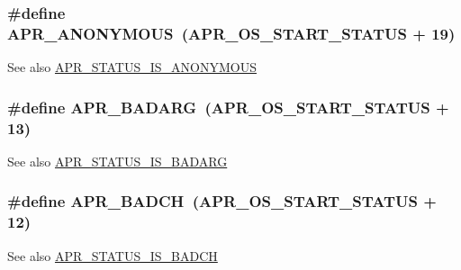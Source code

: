 \subsubsection[{\texorpdfstring{A\+P\+R\+\_\+\+A\+N\+O\+N\+Y\+M\+O\+US}{APR_ANONYMOUS}}]{\setlength{\rightskip}{0pt plus 5cm}\#define A\+P\+R\+\_\+\+A\+N\+O\+N\+Y\+M\+O\+US~({\bf A\+P\+R\+\_\+\+O\+S\+\_\+\+S\+T\+A\+R\+T\+\_\+\+S\+T\+A\+T\+US} + 19)}\hypertarget{group___a_p_r___error_ga738a229b0c27bd96ae0173fecab251b7}{}\label{group___a_p_r___error_ga738a229b0c27bd96ae0173fecab251b7}
\begin{DoxySeeAlso}{See also}
\hyperlink{group___a_p_r___s_t_a_t_u_s___i_s_gaf0184ec185c17a43b2cc47d475f02cbd}{A\+P\+R\+\_\+\+S\+T\+A\+T\+U\+S\+\_\+\+I\+S\+\_\+\+A\+N\+O\+N\+Y\+M\+O\+US} 
\end{DoxySeeAlso}
\subsubsection[{\texorpdfstring{A\+P\+R\+\_\+\+B\+A\+D\+A\+RG}{APR_BADARG}}]{\setlength{\rightskip}{0pt plus 5cm}\#define A\+P\+R\+\_\+\+B\+A\+D\+A\+RG~({\bf A\+P\+R\+\_\+\+O\+S\+\_\+\+S\+T\+A\+R\+T\+\_\+\+S\+T\+A\+T\+US} + 13)}\hypertarget{group___a_p_r___error_ga771bf48ab38d93355be8530f6efe4ae9}{}\label{group___a_p_r___error_ga771bf48ab38d93355be8530f6efe4ae9}
\begin{DoxySeeAlso}{See also}
\hyperlink{group___a_p_r___s_t_a_t_u_s___i_s_gaf784c37a602fdc328436ecda79110f43}{A\+P\+R\+\_\+\+S\+T\+A\+T\+U\+S\+\_\+\+I\+S\+\_\+\+B\+A\+D\+A\+RG} 
\end{DoxySeeAlso}
\subsubsection[{\texorpdfstring{A\+P\+R\+\_\+\+B\+A\+D\+CH}{APR_BADCH}}]{\setlength{\rightskip}{0pt plus 5cm}\#define A\+P\+R\+\_\+\+B\+A\+D\+CH~({\bf A\+P\+R\+\_\+\+O\+S\+\_\+\+S\+T\+A\+R\+T\+\_\+\+S\+T\+A\+T\+US} + 12)}\hypertarget{group___a_p_r___error_ga6f3ca71069880d9fe5678687a257d616}{}\label{group___a_p_r___error_ga6f3ca71069880d9fe5678687a257d616}
\begin{DoxySeeAlso}{See also}
\hyperlink{group___a_p_r___s_t_a_t_u_s___i_s_ga159d2c1c1a9c43ef44b09a6f96967a73}{A\+P\+R\+\_\+\+S\+T\+A\+T\+U\+S\+\_\+\+I\+S\+\_\+\+B\+A\+D\+CH} 
\end{DoxySeeAlso}
